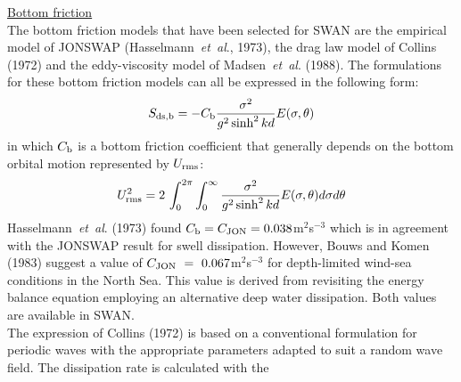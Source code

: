 \documentclass[12pt]{book}
\begin{document}
\underline{Bottom friction}\\[2ex]
The bottom friction models that have been selected for SWAN are the empirical model of JONSWAP
(Hasselmann~{\it et~al}., 1973), the drag law model of Collins (1972) and the eddy-viscosity model of
Madsen~{\it et~al}. (1988). The formulations for these bottom friction models can all be expressed in the following form:
\begin{equation}
  S_{\rm ds,b} = -C_{\rm b} \frac{\sigma^2}{g^2 \sinh^2 kd} E (\sigma,\theta)
  \label{eq3-17}
\end{equation}
in which $C_{\rm b}$ is a bottom friction coefficient that generally depends on the bottom orbital motion
represented by $U_{\rm rms}$:
\begin{equation}
  U^2_{\rm rms} = 2\,\int_{0}^{2\pi} \int_{0}^{\infty} \frac{\sigma^2}{g^2 \sinh^2 kd} E(\sigma,\theta) d\sigma d\theta
  \label{eq3-18}
\end{equation}
Hasselmann~{\it et~al}. (1973) found $C_{\rm b}=C_{\rm JON}=0.038$m$^{2}$s$^{-3}$ which is in
agreement with the JONSWAP result for swell dissipation. However, Bouws and Komen (1983) suggest a
value of $C_{\rm JON}~=~0.067$m$^{2}$s$^{-3}$ for depth-limited wind-sea conditions in the North Sea. This value is derived
from revisiting the energy balance equation employing an alternative deep water dissipation.
Both values are available in SWAN.
\\[2ex]
\noindent
The expression of Collins (1972) is based on a conventional formulation for periodic waves with the
appropriate parameters adapted to suit a random wave field. The dissipation rate is calculated with the
\end{document}
